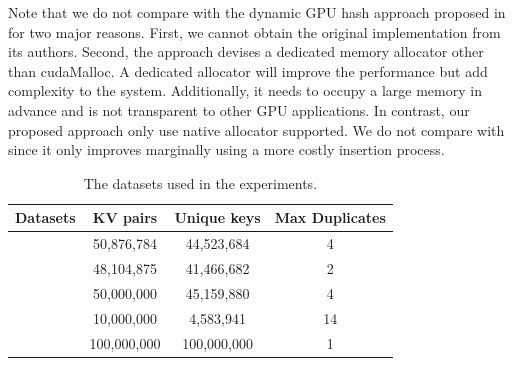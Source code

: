 Note that we do not compare with the dynamic GPU hash approach proposed in \cite{ashkiani2018dynamic} for two major reasons. First, we cannot obtain the original implementation from its authors. Second, the approach devises a dedicated memory allocator other than cudaMalloc. A dedicated allocator will improve the performance but add complexity to the system. Additionally, it needs to occupy a large memory in advance and is not transparent to other GPU applications.
In contrast, our proposed approach only use native allocator supported. 
We do not compare with \cite{breslow2016horton} since it only improves \megakv marginally using a more costly insertion process.

\begin{table}[t]
	\caption{The datasets used in the experiments.}
	\label{table:exp_data_sets}
	\centering
	\begin{tabular}{|c|c|c|c|}
		\hline
		Datasets & KV pairs & Unique keys & Max Duplicates \\ \hline
		\dstwitter &50,876,784 & 44,523,684&4\\ \hline
		\dsreddit & 48,104,875 & 41,466,682 &2 \\ \hline
		\dstpch &50,000,000 & 45,159,880&4\\ \hline
		\dsali &10,000,000 & 4,583,941&14\\ \hline
		\dsrandom & 100,000,000& 100,000,000& 1 \\ \hline
	\end{tabular}
\end{table}

